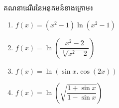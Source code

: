 \documentclass[a4paper,12pt]{article}
\begin{document}
\begin{exercise}
	គណនាដេរីវេនៃអនុគមន៍ខាងក្រោម៖
	\begin{multicols}{2}
		\begin{enumerate}
			\item $f(x)=(x^2-1)\ln (x^2-1)$
			\item $f(x)=\ln \left( \dfrac{x^2-2}{\sqrt[3]{x^2-2}} \right)$
			\item $f(x)=\ln (\sin x.\cos(2x))$
			\item $f(x)=\ln \left(\sqrt{\dfrac{1+\sin x}{1-\sin x}} \right)$
		\end{enumerate}
	\end{multicols}
\end{exercise}
\answer
\end{document}
